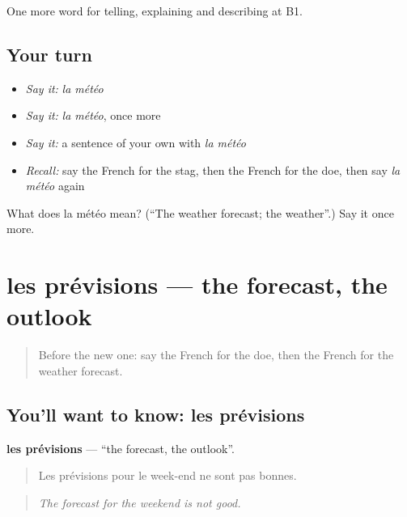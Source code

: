 \begin{grammarlens}[title={What you've built}]
One more word for telling, explaining and describing at B1.
\end{grammarlens}

\subsection*{Your turn}
\begin{itemize}
\raggedright
  \item \emph{Say it:} \emph{la météo}
  \item \emph{Say it:} \emph{la météo}, once more
  \item \emph{Say it:} a sentence of your own with \emph{la météo}
  \item \emph{Recall:} say the French for the stag, then the French for the doe, then say \emph{la météo} again
\end{itemize}

\begin{tcolorbox}[breakable,colback=teal!4,colframe=teal!35!black,title={Before you move on}]
What does la météo mean? (\textquotedblleft{}The weather forecast; the weather\textquotedblright{}.) Say it once more.
\end{tcolorbox}
\section[les prévisions]{les prévisions — the forecast, the outlook}

\label{lesson:FR-C460-previsions}



\begin{quote}
Before the new one: say the French for the doe, then the French for the weather forecast.
\end{quote}

\subsection*{You'll want to know: les prévisions}
\textbf{les prévisions} — \textquotedblleft{}the forecast, the outlook\textquotedblright{}.

\begin{quote}
Les prévisions pour le week-end ne sont pas bonnes.
\end{quote}

\begin{quote}
\emph{The forecast for the weekend is not good.}
\end{quote}

